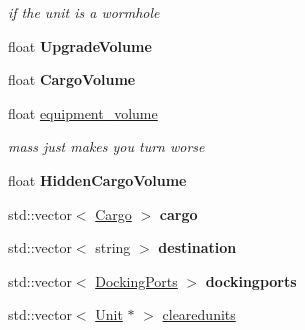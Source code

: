 \begin{DoxyCompactItemize}
\begin{DoxyCompactList}\small\item\em if the unit is a wormhole \end{DoxyCompactList}\item 
float {\bfseries Upgrade\+Volume}\hypertarget{structUnitImages_a256867033660f17f9d271c669441ed97}{}\label{structUnitImages_a256867033660f17f9d271c669441ed97}

\item 
float {\bfseries Cargo\+Volume}\hypertarget{structUnitImages_a5e021781f2c3acccfe5432d74d62c3dd}{}\label{structUnitImages_a5e021781f2c3acccfe5432d74d62c3dd}

\item 
float \hyperlink{structUnitImages_af3e5df552ccef62c4ffe1864b96caa11}{equipment\+\_\+volume}\hypertarget{structUnitImages_af3e5df552ccef62c4ffe1864b96caa11}{}\label{structUnitImages_af3e5df552ccef62c4ffe1864b96caa11}

\begin{DoxyCompactList}\small\item\em mass just makes you turn worse \end{DoxyCompactList}\item 
float {\bfseries Hidden\+Cargo\+Volume}\hypertarget{structUnitImages_a7809597c472f73ce8dcfb378e0d31bad}{}\label{structUnitImages_a7809597c472f73ce8dcfb378e0d31bad}

\item 
std\+::vector$<$ \hyperlink{classCargo}{Cargo} $>$ {\bfseries cargo}\hypertarget{structUnitImages_a2f3e594a95af46a34a2f2aa36786740b}{}\label{structUnitImages_a2f3e594a95af46a34a2f2aa36786740b}

\item 
std\+::vector$<$ string $>$ {\bfseries destination}\hypertarget{structUnitImages_af5af7b37f311126ec53aeeb3ea124af0}{}\label{structUnitImages_af5af7b37f311126ec53aeeb3ea124af0}

\item 
std\+::vector$<$ \hyperlink{structDockingPorts}{Docking\+Ports} $>$ {\bfseries dockingports}\hypertarget{structUnitImages_aff23677ef10c47b332a304d4c917d053}{}\label{structUnitImages_aff23677ef10c47b332a304d4c917d053}

\item 
std\+::vector$<$ \hyperlink{classUnit}{Unit} $\ast$ $>$ \hyperlink{structUnitImages_ae9c57a71af38e9b1ac078ace988d260b}{clearedunits}\hypertarget{structUnitImages_ae9c57a71af38e9b1ac078ace988d260b}{}\label{structUnitImages_ae9c57a71af38e9b1ac078ace988d260b}


\end{DoxyCompactItemize}
